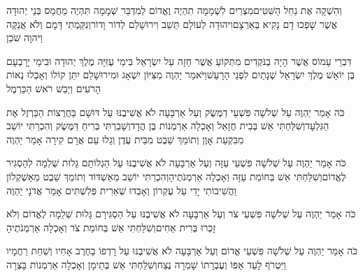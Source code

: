 \documentclass[../main/main.tex]{subfiles}
\begin{document}
\begin{multicols*}{\ncols}
וְהִשְׁקָה אֶת נַחַל הַשִּׁטִּים\PreVerseSpace{}מִצְרַיִם לִשְׁמָמָה תִהְיֶה וֶאֱדוֹם לְמִדְבַּר שְׁמָמָה תִּהְיֶה מֵחֲמַס בְּנֵי יְהוּדָה אֲשֶׁר שָׁפְכוּ דָם נָקִיא בְּאַרְצָם\PreVerseSpace{}וִיהוּדָה לְעוֹלָם תֵּשֵׁב וִירוּשָׁלֵם לְדוֹר וָדוֹר\PreVerseSpace{}וְנִקַּמְתִי\SubEnd{} דָּמָם וְלֹא אֲנַקֶּה\SubEnd{} וַיהוָה שֹׁכֵן\par
\end{multicols*}
\pagebreak
{}
\begin{multicols*}{\ncols}
דִּבְרֵי עָמוֹס אֲשֶׁר הָיָה בַנֹּקְדִים מִתְּקוֹעַ אֲשֶׁר חָזָה עַל יִשְׂרָאֵל בִּימֵי עֻזִּיָּה מֶלֶךְ יְהוּדָה וּבִימֵי יָרָבְעָם בֶּן יוֹאָשׁ מֶלֶךְ יִשְׂרָאֵל שְׁנָתַיִם לִפְנֵי הָרָעַשׁ\PreVerseSpace{}וַיֹּאמַר יַהְוֶה מִצִּיּוֹן יִשְׁאָג וּמִירוּשָׁלֵם יִתֵּן קוֹלוֹ וְאָבְלוּ נְאוֹת הָרֹעִים וְיָבֵשׁ רֹאשׁ הַכַּרְמֶל\OpenSection{}\par
{}כֹּה אָמַר יַהְוֶה עַל שְׁלֹשָׁה פִּשְׁעֵי דַמֶּשֶׂק וְעַל אַרְבָּעָה לֹא אֲשִׁיבֶנּוּ עַל דּוּשָׁם בַּחֲרֻצוֹת הַבַּרְזֶל אֶת הַגִּלְעָד\PreVerseSpace{}וְשִׁלַּחְתִּי אֵשׁ בְּבֵית חֲזָאֵל וְאָכְלָה אַרְמְנוֹת בֶּן הֲדָד\PreVerseSpace{}וְשָׁבַרְתִּי בְּרִיחַ דַּמֶּשֶׂק וְהִכְרַתִּי יוֹשֵׁב מִבִּקְעַת אָוֶן וְתוֹמֵךְ שֵׁבֶט מִבֵּית עֶדֶן וְגָלוּ עַם אֲרָם קִירָה אָמַר יַהְוֶה\OpenSection{}\par
{}כֹּה אָמַר יַהְוֶה עַל שְׁלֹשָׁה פִּשְׁעֵי עַזָּה וְעַל אַרְבָּעָה לֹא אֲשִׁיבֶנּוּ עַל הַגְלוֹתָם גָּלוּת שְׁלֵמָה לְהַסְגִּיר לֶאֱדוֹם\PreVerseSpace{}וְשִׁלַּחְתִּי אֵשׁ בְּחוֹמַת עַזָּה וְאָכְלָה אַרְמְנֹתֶיהָ\PreVerseSpace{}וְהִכְרַתִּי יוֹשֵׁב מֵאַשְׁדּוֹד וְתוֹמֵךְ שֵׁבֶט מֵאַשְׁקְלוֹן וַהֲשִׁיבוֹתִי יָדִי עַל עֶקְרוֹן וְאָבְדוּ שְׁאֵרִית פְּלִשְׁתִּים אָמַר אֲדֹנָי יַהְוֶה\OpenSection{}\par
{}כֹּה אָמַר יַהְוֶה עַל שְׁלֹשָׁה פִּשְׁעֵי צֹר וְעַל אַרְבָּעָה לֹא אֲשִׁיבֶנּוּ עַל הַסְגִּירָם גָּלוּת שְׁלֵמָה לֶאֱדוֹם וְלֹא זָכְרוּ בְּרִית אַחִים\PreVerseSpace{}וְשִׁלַּחְתִּי אֵשׁ בְּחוֹמַת צֹר וְאָכְלָה אַרְמְנֹתֶיהָ\OpenSection{}\par
{}כֹּה אָמַר יַהְוֶה עַל שְׁלֹשָׁה פִּשְׁעֵי אֱדוֹם וְעַל אַרְבָּעָה לֹא אֲשִׁיבֶנּוּ עַל רָדְפוֹ בַחֶרֶב אָחִיו וְשִׁחֵת רַחֲמָיו וַיִּטְרֹף לָעַד אַפּוֹ וְעֶבְרָתוֹ שָׁמְרָה\SubEnd{} נֶצַח\PreVerseSpace{}וְשִׁלַּחְתִּי אֵשׁ בְּתֵימָן וְאָכְלָה אַרְמְנוֹת בָּצְרָה\OpenSection{}\par

\end{multicols*}
\end{document}

